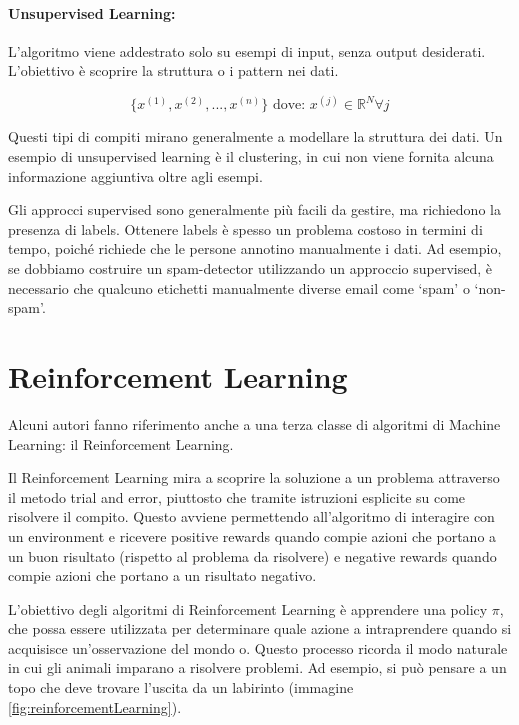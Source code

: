 \paragraph{Unsupervised Learning:} L'algoritmo viene addestrato solo su esempi di input, senza output desiderati. L'obiettivo è scoprire la struttura o i pattern nei dati.

$$ \{x^{(1)}, x^{(2)}, ..., x^{(n)}\} \text{ dove: } x^{(j)} \in \mathbb{R}^{N} \forall j$$

Questi tipi di compiti mirano generalmente a modellare la struttura dei dati. Un esempio di unsupervised learning è il clustering, in cui non viene fornita alcuna informazione aggiuntiva oltre agli esempi.

Gli approcci supervised sono generalmente più facili da gestire, ma richiedono la presenza di labels. Ottenere labels è spesso un problema costoso in termini di tempo, poiché richiede che le persone annotino manualmente i dati. Ad esempio, se dobbiamo costruire un spam-detector utilizzando un approccio supervised, è necessario che qualcuno etichetti manualmente diverse email come ‘spam’ o ‘non-spam’.

\section{Reinforcement Learning}

Alcuni autori fanno riferimento anche a una terza classe di algoritmi di Machine Learning: il Reinforcement Learning.

Il Reinforcement Learning mira a scoprire la soluzione a un problema attraverso il metodo trial and error, piuttosto che tramite istruzioni esplicite su come risolvere il compito. Questo avviene permettendo all'algoritmo di interagire con un environment e ricevere positive rewards quando compie azioni che portano a un buon risultato (rispetto al problema da risolvere) e negative rewards quando compie azioni che portano a un risultato negativo.

L'obiettivo degli algoritmi di Reinforcement Learning è apprendere una policy $\pi$, che possa essere utilizzata per determinare quale azione a intraprendere quando si acquisisce un'osservazione del mondo o. Questo processo ricorda il modo naturale in cui gli animali imparano a risolvere problemi. Ad esempio, si può pensare a un topo che deve trovare l'uscita da un labirinto (immagine \ref{fig:reinforcementLearning}).

